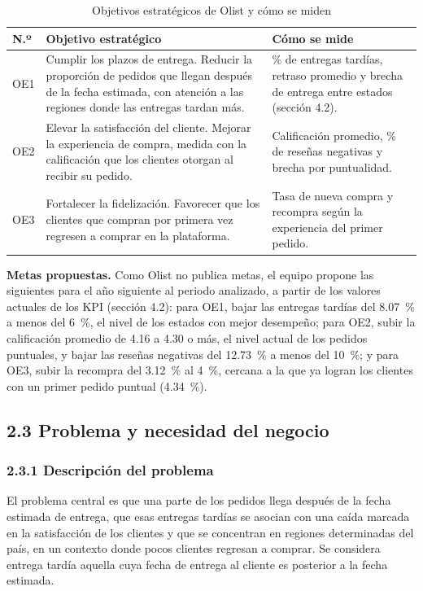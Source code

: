 \documentclass[a4paper,stu,12pt,donotrepeattitle,floatsintext]{apa7}
\begin{document}
{\footnotesize
\begin{longtable}{|>{\raggedright\arraybackslash}p{}|>{\raggedright\arraybackslash}p{}|>{\raggedright\arraybackslash}p{}|}
\caption{Objetivos estratégicos de Olist y cómo se miden}\\
\hline
\textbf{N.º} & \textbf{Objetivo estratégico} & \textbf{Cómo se mide} \\ \hline
\endhead
OE1 & Cumplir los plazos de entrega. Reducir la proporción de pedidos que llegan después de la fecha estimada, con atención a las regiones donde las entregas tardan más. & \% de entregas tardías, retraso promedio y brecha de entrega entre estados (sección 4.2). \\ \hline
OE2 & Elevar la satisfacción del cliente. Mejorar la experiencia de compra, medida con la calificación que los clientes otorgan al recibir su pedido. & Calificación promedio, \% de reseñas negativas y brecha por puntualidad. \\ \hline
OE3 & Fortalecer la fidelización. Favorecer que los clientes que compran por primera vez regresen a comprar en la plataforma. & Tasa de nueva compra y recompra según la experiencia del primer pedido. \\ \hline
\end{longtable}
}
\textbf{Metas propuestas.} Como Olist no publica metas, el equipo propone las siguientes para el año siguiente al periodo analizado, a partir de los valores actuales de los KPI (sección 4.2): para OE1, bajar las entregas tardías del 8.07~\% a menos del 6~\%, el nivel de los estados con mejor desempeño; para OE2, subir la calificación promedio de 4.16 a 4.30 o más, el nivel actual de los pedidos puntuales, y bajar las reseñas negativas del 12.73~\% a menos del 10~\%; y para OE3, subir la recompra del 3.12~\% al 4~\%, cercana a la que ya logran los clientes con un primer pedido puntual (4.34~\%).

\subsection{2.3 Problema y necesidad del negocio}
\subsubsection{2.3.1 Descripción del problema}
El problema central es que una parte de los pedidos llega después de la fecha estimada de entrega, que esas entregas tardías se asocian con una caída marcada en la satisfacción de los clientes y que se concentran en regiones determinadas del país, en un contexto donde pocos clientes regresan a comprar. Se considera entrega tardía aquella cuya fecha de entrega al cliente es posterior a la fecha estimada.
\end{document}
